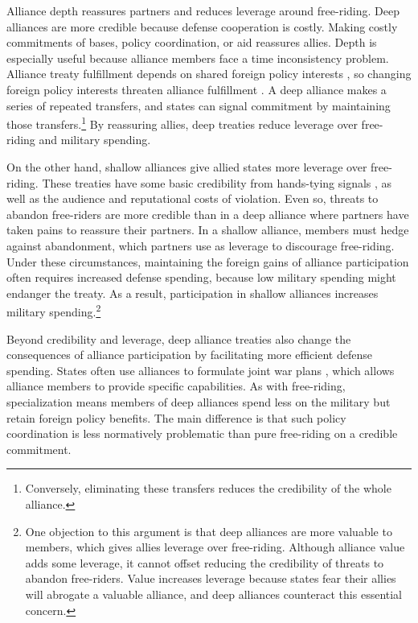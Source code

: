 \documentclass[12pt]{article}
\begin{document}
Alliance depth reassures partners and reduces leverage around free-riding.  
Deep alliances are more credible because defense cooperation is costly. 
Making costly commitments of bases, policy coordination, or aid reassures allies. 
Depth is especially useful because alliance members face a time inconsistency problem. 
Alliance treaty fulfillment depends on shared foreign policy interests \citep{Morrow2000, Leeds2003a}, so changing foreign policy interests threaten alliance fulfillment \citep{LeedsSavun2007}. 
A deep alliance makes a series of repeated transfers, and states can signal commitment by maintaining those transfers.\footnote{Conversely, eliminating these transfers reduces the credibility of the whole alliance.} 
By reassuring allies, deep treaties reduce leverage over free-riding and military spending. 


On the other hand, shallow alliances give allied states more leverage over free-riding. 
These treaties have some basic credibility from hands-tying signals \citep{Fearon1997}, as well as the audience \cite{Morrow2000} and reputational \citep{Gibler2008, Crescenzietal2012} costs of violation.
Even so, threats to abandon free-riders are more credible than in a deep alliance where partners have taken pains to reassure their partners.  
In a shallow alliance, members must hedge against abandonment, which partners use as leverage to discourage free-riding. 
Under these circumstances, maintaining the foreign gains of alliance participation often requires increased defense spending, because low military spending might endanger the treaty. 
As a result, participation in shallow alliances increases military spending.\footnote{
One objection to this argument is that deep alliances are more valuable to members, which gives allies leverage over free-riding. 
Although alliance value adds some leverage, it cannot offset reducing the credibility of threats to abandon free-riders.
Value increases leverage because states fear their allies will abrogate a valuable alliance, and deep alliances counteract this essential concern. 
}


Beyond credibility and leverage, deep alliance treaties also change the consequences of alliance participation by facilitating more efficient defense spending. 
States often use alliances to formulate joint war plans \citep{Poast2019a}, which allows alliance members to provide specific capabilities. 
As with free-riding, specialization means members of deep alliances spend less on the military but retain foreign policy benefits.
The main difference is that such policy coordination is less normatively problematic than pure free-riding on a credible commitment. 
\end{document}
